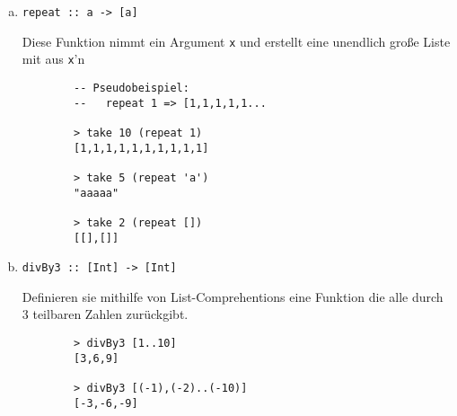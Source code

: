\documentclass{article}
\begin{document}
\begin{enumerate} [a)]
    \begin{verbatim}
        > take 3 [1,2,3,4,5]
        [1,2,3]
       
        > take 10 [1,2,3]
        [1,2,3]
       
        > take 0 [1,2,3]
        []
    \end{verbatim}

    \item \begin{verbatim}
repeat :: a -> [a]
          \end{verbatim}
    Diese Funktion nimmt ein Argument \texttt{x} und erstellt eine unendlich große Liste mit aus \texttt{x}'n
    \begin{verbatim}
        -- Pseudobeispiel:
        --   repeat 1 => [1,1,1,1,1...

        > take 10 (repeat 1)
        [1,1,1,1,1,1,1,1,1,1]

        > take 5 (repeat 'a')
        "aaaaa"

        > take 2 (repeat [])
        [[],[]]
    \end{verbatim}

    \item \begin{verbatim}
divBy3 :: [Int] -> [Int]
          \end{verbatim}
    Definieren sie mithilfe von List-Comprehentions eine Funktion die alle durch 3 teilbaren Zahlen zurückgibt.
    \begin{verbatim}
        > divBy3 [1..10]
        [3,6,9]
       
        > divBy3 [(-1),(-2)..(-10)]
        [-3,-6,-9]
    \end{verbatim}

\end{enumerate}
\end{document}
